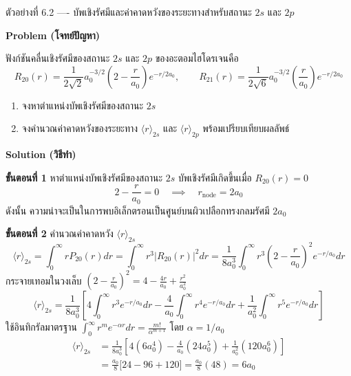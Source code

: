 \begin{psctbox}{ตัวอย่างที่ 6.2 ---- บัพเชิงรัศมีและค่าคาดหวังของระยะทางสำหรับสถานะ $2s$ และ $2p$}

\textbf{Problem (โจทย์ปัญหา)}

ฟังก์ชันคลื่นเชิงรัศมีของสถานะ $2s$ และ $2p$ ของอะตอมไฮโดรเจนคือ
\begin{equation*}
R_{20}(r) = \frac{1}{2\sqrt{2}} a_0^{-3/2} \left( 2 - \frac{r}{a_0} \right) e^{-r/2a_0}, \qquad R_{21}(r) = \frac{1}{2\sqrt{6}} a_0^{-3/2} \left( \frac{r}{a_0} \right) e^{-r/2a_0}
\end{equation*}
\begin{enumerate}
    \item จงหาตำแหน่งบัพเชิงรัศมีของสถานะ $2s$
    \item จงคำนวณค่าคาดหวังของระยะทาง $\langle r \rangle_{2s}$ และ $\langle r \rangle_{2p}$ พร้อมเปรียบเทียบผลลัพธ์
\end{enumerate}

\textbf{Solution (วิธีทำ)}

\textbf{ขั้นตอนที่ 1} หาตำแหน่งบัพเชิงรัศมีของสถานะ $2s$
บัพเชิงรัศมีเกิดขึ้นเมื่อ $R_{20}(r) = 0$
\begin{equation*}
2 - \frac{r}{a_0} = 0 \quad \implies \quad r_{\text{node}} = 2 a_0
\end{equation*}
ดังนั้น ความน่าจะเป็นในการพบอิเล็กตรอนเป็นศูนย์บนผิวเปลือกทรงกลมรัศมี $2a_0$

\textbf{ขั้นตอนที่ 2} คำนวณค่าคาดหวัง $\langle r \rangle_{2s}$
\begin{equation*}
\langle r \rangle_{2s} = \int_0^\infty r P_{20}(r) dr = \int_0^\infty r^3 |R_{20}(r)|^2 dr = \frac{1}{8 a_0^3} \int_0^\infty r^3 \left( 2 - \frac{r}{a_0} \right)^2 e^{-r/a_0} dr
\end{equation*}
กระจายเทอมในวงเล็บ $\left( 2 - \frac{r}{a_0} \right)^2 = 4 - \frac{4r}{a_0} + \frac{r^2}{a_0^2}$
\begin{equation*}
\langle r \rangle_{2s} = \frac{1}{8 a_0^3} \left[ 4 \int_0^\infty r^3 e^{-r/a_0} dr - \frac{4}{a_0} \int_0^\infty r^4 e^{-r/a_0} dr + \frac{1}{a_0^2} \int_0^\infty r^5 e^{-r/a_0} dr \right]
\end{equation*}
ใช้อินทิกรัลมาตรฐาน $\int_0^\infty r^m e^{-\alpha r} dr = \frac{m!}{\alpha^{m+1}}$ โดย $\alpha = 1/a_0$
\begin{align*}
\langle r \rangle_{2s} &= \frac{1}{8 a_0^3} \left[ 4(6 a_0^4) - \frac{4}{a_0}(24 a_0^5) + \frac{1}{a_0^2}(120 a_0^6) \right] \\
&= \frac{a_0}{8} \big[ 24 - 96 + 120 \big] = \frac{a_0}{8} (48) = 6 a_0
\end{align*}


\end{psctbox}
